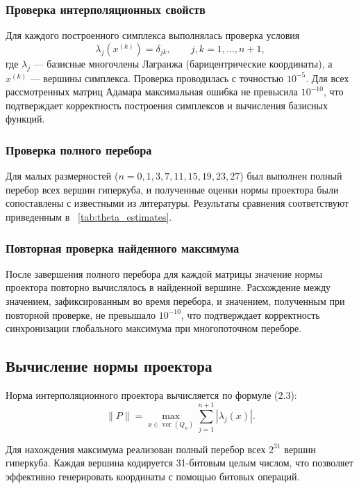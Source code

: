 \documentclass[main]{subfiles}
\begin{document}
\subsubsection{Проверка интерполяционных свойств}

Для каждого построенного симплекса выполнялась проверка условия
\[
\lambda_j(x^{(k)}) = \delta_{jk}, \qquad j,k = 1,\dots,n+1,
\]
где $\lambda_j$ — базисные многочлены Лагранжа (барицентрические координаты), а $x^{(k)}$ — вершины симплекса. Проверка проводилась с точностью $10^{-5}$. Для всех рассмотренных матриц Адамара максимальная ошибка не превысила $10^{-10}$, что подтверждает корректность построения симплексов и вычисления базисных функций.

\subsubsection{Проверка полного перебора}

Для малых размерностей ($n = 0, 1, 3, 7, 11, 15, 19, 23, 27$) был выполнен полный перебор всех вершин гиперкуба, и полученные оценки нормы проектора были сопоставлены с известными из литературы. Результаты сравнения соответствуют приведенным в ~\ref{tab:theta_estimates}.

\subsubsection{Повторная проверка найденного максимума}

После завершения полного перебора для каждой матрицы значение нормы проектора повторно вычислялось в найденной вершине. Расхождение между значением, зафиксированным во время перебора, и значением, полученным при повторной проверке, не превышало $10^{-10}$, что подтверждает корректность синхронизации глобального максимума при многопоточном переборе.

\subsection{Вычисление нормы проектора}

Норма интерполяционного проектора вычисляется по формуле (2.3):
\[
\|P\| = \max_{x \in \operatorname{ver}(Q_n)} \sum_{j=1}^{n+1} |\lambda_j(x)|.
\]

Для нахождения максимума реализован полный перебор всех $2^{31}$ вершин гиперкуба. Каждая вершина кодируется 31-битовым целым числом, что позволяет эффективно генерировать координаты с помощью битовых операций.
\end{document}
